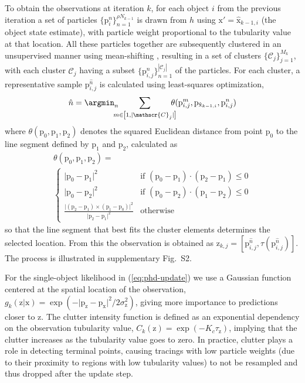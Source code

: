 To obtain the observations at iteration $k$, for each object $i$ from the previous iteration a set of particles $\{\mathrm{p}_{i}^{n}\}_{n=1}^{\rho N_{k-1}}$ is drawn from $h$ using $\mathrm{x'}=\hat{\mathrm{x}}_{k-1,i}$ (the object state estimate), with particle weight proportional to the tubularity value at that location. All these particles together are subsequently clustered in an unsupervised manner using mean-shifting \citep{cheng1995mean}, resulting in a set of clusters $\lbrace \mathscr{C}_j \rbrace_{j=1}^{M_k}$, with each cluster $\mathscr{C}_j$ having a subset $\lbrace\mathrm{p}_{i,j}^n\rbrace_{n=1}^{|\mathscr{C}_j|}$ of the particles. For each cluster, a representative sample $\mathrm{p}_{i,j}^{\hat{n}}$ is calculated using least-squares optimization,
\begin{equation}
\label{eq:n-measure} %
\hat{n} = \argmin_n \!\!\!\!\!\sum\limits_{m \in \left[ 1, |\mathscr{C}_j| \right]}\!\!\!\!\! \theta(\mathrm{p}_{i,j}^m, \mathrm{p}_{\hat{\mathrm{x}}_{k-1,i}}, \mathrm{p}_{i,j}^n)
\end{equation} %
where $\theta(\mathrm{p}_0, \mathrm{p}_1, \mathrm{p}_2)$ denotes the squared Euclidean distance from point $\mathrm{p}_0$ to the line segment defined by $\mathrm{p}_1$ and $\mathrm{p}_2$, calculated as
\begin{multline}
\label{eq:theta}
\theta(\mathrm{p}_0, \mathrm{p}_1, \mathrm{p}_2) = \\
\begin{cases}
	\vert \mathrm{p}_0 - \mathrm{p}_1 \vert^2 & \textrm{if\ } (\mathrm{p}_0-\mathrm{p}_1) \cdot (\mathrm{p}_2-\mathrm{p}_1) \leq 0 \\
	\vert \mathrm{p}_0 - \mathrm{p}_2 \vert^2 & \textrm{if\ } (\mathrm{p}_0-\mathrm{p}_2) \cdot (\mathrm{p}_1-\mathrm{p}_2) \leq 0 \\
	\frac{\vert(\mathrm{p}_2-\mathrm{p}_1) \times (\mathrm{p}_1-\mathrm{p}_0)\vert^2}{\vert\mathrm{p}_2-\mathrm{p}_1\vert^2} & \textrm{otherwise}
\end{cases}
\end{multline}
so that the line segment that best fits the cluster elements determines the selected location. From this the observation is obtained as $\mathrm{z}_{k,j} = [\mathrm{p}_{i,j}^{\hat{n}}, \tau(\mathrm{p}_{i,j}^{\hat{n}})]$. The process is illustrated in supplementary Fig.~S2.

For the single-object likelihood in (\ref{eq:phd-update}) we use a Gaussian function centered at the spatial location of the observation, $g_k(\mathrm{z}|\mathrm{x})=\exp(-\vert\mathrm{p}_{\mathrm{z}}-\mathrm{p}_{\mathrm{x}}\vert^2/2\sigma_{\mathrm{z}}^2)$, giving more importance to predictions closer to $\mathrm{z}$. The clutter intensity function is defined as an exponential dependency on the observation tubularity value, $C_k(\mathrm{z})=\exp(-K_{c}\tau_{\mathrm{z}})$, implying that the clutter increases as the tubularity value goes to zero. In practice, clutter plays a role in detecting terminal points, causing tracings with low particle weights (due to their proximity to regions with low tubularity values) to not be resampled and thus dropped after the update step.

